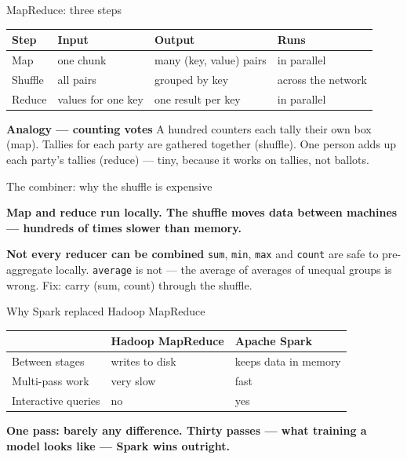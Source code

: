 \documentclass[10pt,aspectratio=169]{beamer}
\newcommand{\keyidea}[1]{%
  \begin{block}{}
  \centering\Large\bfseries\color{dsblue} #1
  \end{block}%
}
\newcommand{\trapbox}[2]{%
  \begin{alertblock}{\textbf{#1}}
  #2
  \end{alertblock}%
}
\newcommand{\analogybox}[2]{%
  \begin{exampleblock}{\textbf{Analogy --- #1}}
  #2
  \end{exampleblock}%
}
\begin{document}
\begin{frame}{MapReduce: three steps}
\begin{table}
\small
\begin{tabularx}{\linewidth}{@{}lXXl@{}}
\toprule
\textbf{Step} & \textbf{Input} & \textbf{Output} & \textbf{Runs} \\
\midrule
Map & one chunk & many (key, value) pairs & in parallel \\
Shuffle & all pairs & grouped by key & across the network \\
Reduce & values for one key & one result per key & in parallel \\
\bottomrule
\end{tabularx}
\end{table}
\analogybox{counting votes}{A hundred counters each tally their own box (map). Tallies for each party are gathered together (shuffle). One person adds up each party's tallies (reduce) --- tiny, because it works on tallies, not ballots.}
\end{frame}

\begin{frame}{The combiner: why the shuffle is expensive}
\keyidea{Map and reduce run locally. The shuffle moves data between machines --- hundreds of times slower than memory.}
\trapbox{Not every reducer can be combined}{\texttt{sum}, \texttt{min}, \texttt{max} and \texttt{count} are safe to pre-aggregate locally. \texttt{average} is not --- the average of averages of unequal groups is wrong. Fix: carry (sum, count) through the shuffle.}
\end{frame}

\begin{frame}{Why Spark replaced Hadoop MapReduce}
\begin{table}
\small
\begin{tabularx}{\linewidth}{@{}lXX@{}}
\toprule
& \textbf{Hadoop MapReduce} & \textbf{Apache Spark} \\
\midrule
Between stages & writes to disk & keeps data in memory \\
Multi-pass work & very slow & fast \\
Interactive queries & no & yes \\
\bottomrule
\end{tabularx}
\end{table}
\keyidea{One pass: barely any difference. Thirty passes --- what training a model looks like --- Spark wins outright.}
\end{frame}
\end{document}
